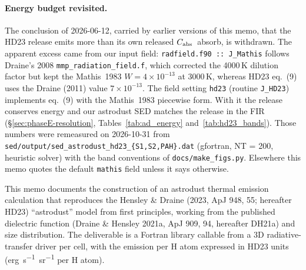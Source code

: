 \documentclass{my_memo}
\newcommand{\Cabs}{\ensuremath{C_{\rm abs}}}
\begin{document}
\paragraph{Energy budget revisited.}
The conclusion of 2026-06-12, carried by earlier versions of this memo,
that the HD23 release emits more than its own released \Cabs\ absorb,
is withdrawn. The apparent excess came from our input field:
\texttt{radfield.f90 :: J\_Mathis} follows Draine's 2008
\texttt{mmp\_radiation\_field.f}, which corrected the 4000\,K dilution
factor but kept the Mathis~1983 $W = 4\times10^{-13}$ at 3000\,K,
whereas HD23 eq.~(9) uses the Draine (2011) value $7\times10^{-13}$.
The field setting \texttt{hd23} (routine \texttt{J\_HD23}) implements
eq.~(9) with the Mathis~1983 piecewise form. With it the release
conserves energy and our astrodust SED matches the release in the FIR
(\S\ref{sec:phaseE-resolution}, Tables~\ref{tab:ad_energy}
and~\ref{tab:hd23_bands}). Those numbers were remeasured on 2026-10-31
from \texttt{sed/output/sed\_astrodust\_hd23\_\{S1,S2,PAH\}.dat}
(gfortran, NT = 200, heuristic solver) with the band conventions of
\texttt{docs/make\_figs.py}. Elsewhere this memo quotes the default
\texttt{mathis} field unless it says otherwise.

This memo documents the construction of an astrodust thermal emission
calculation that reproduces the Hensley \& Draine (2023, ApJ 948, 55;
hereafter HD23) ``astrodust'' model from first principles, working
from the published dielectric function (Draine \& Hensley
2021a, ApJ 909, 94, hereafter DH21a) and size distribution. The
deliverable is a Fortran library callable from a 3D radiative-transfer
driver per cell, with the emission per H atom expressed in HD23 units
(\si{erg.s^{-1}.sr^{-1}} per H atom).
\end{document}
